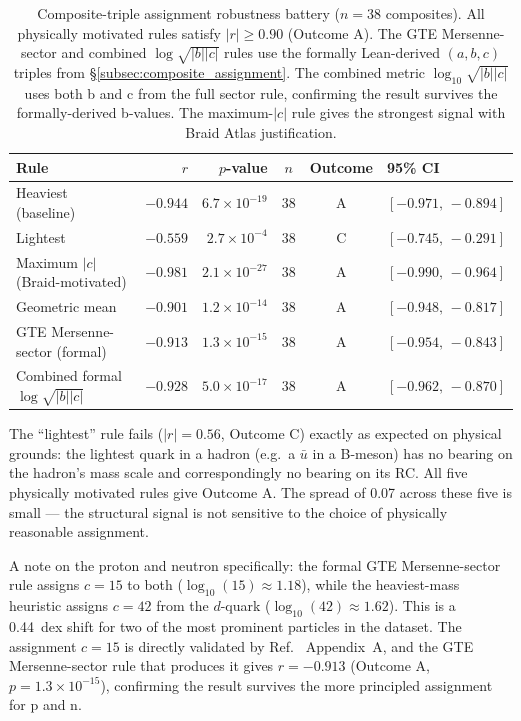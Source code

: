 \documentclass[12pt,a4paper]{article}
\begin{document}
\begin{table}[H]
\centering
\caption{Composite-triple assignment robustness battery ($n=38$ composites).
  All physically motivated rules satisfy $|r| \geq 0.90$ (Outcome A).
  The GTE Mersenne-sector and combined $\log\sqrt{|b||c|}$ rules use the
  formally Lean-derived $(a,b,c)$ triples from \S\ref{subsec:composite_assignment}.
  The combined metric $\log_{10}\!\sqrt{|b||c|}$ uses both b and c from the full
  sector rule, confirming the result survives the formally-derived b-values.
  The maximum-$|c|$ rule gives the strongest signal with Braid Atlas justification.}
\label{tab:robustness}
\small
\begin{tabular}{lrrccl}
\toprule
Rule & $r$ & $p$-value & $n$ & Outcome & 95\% CI \\
\midrule
Heaviest (baseline)       & $-0.944$ & $6.7\times10^{-19}$ & 38 & A & $[-0.971,\,-0.894]$ \\
Lightest                  & $-0.559$ & $2.7\times10^{-4}$  & 38 & C & $[-0.745,\,-0.291]$ \\
Maximum $|c|$ (Braid-motivated) & $-0.981$ & $2.1\times10^{-27}$ & 38 & A & $[-0.990,\,-0.964]$ \\
Geometric mean            & $-0.901$ & $1.2\times10^{-14}$ & 38 & A & $[-0.948,\,-0.817]$ \\
GTE Mersenne-sector (formal) & $-0.913$ & $1.3\times10^{-15}$ & 38 & A & $[-0.954,\,-0.843]$ \\
Combined formal $\log\sqrt{|b||c|}$ & $-0.928$ & $5.0\times10^{-17}$ & 38 & A & $[-0.962,\,-0.870]$ \\
\bottomrule
\end{tabular}
\end{table}

The ``lightest'' rule fails ($|r| = 0.56$, Outcome C) exactly as expected
on physical grounds: the lightest quark in a hadron (e.g.\ a $\bar u$ in
a B-meson) has no bearing on the hadron's mass scale and correspondingly
no bearing on its RC.
All five physically motivated rules give Outcome A.
The spread of 0.07 across these five is small — the structural signal
is not sensitive to the choice of physically reasonable assignment.

A note on the proton and neutron specifically:
the formal GTE Mersenne-sector rule assigns $c = 15$ to both
($\log_{10}(15) \approx 1.18$), while the heaviest-mass heuristic
assigns $c = 42$ from the $d$-quark ($\log_{10}(42) \approx 1.62$).
This is a 0.44~dex shift for two of the most prominent particles in
the dataset.
The assignment $c = 15$ is directly validated by
Ref.~\cite{Spivack2026_SM_UGP} Appendix~A, and the GTE Mersenne-sector
rule that produces it gives $r = -0.913$ (Outcome A, $p = 1.3\times10^{-15}$),
confirming the result survives the more principled assignment for p and n.
\end{document}
